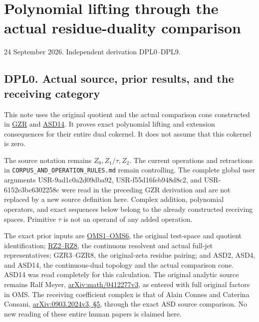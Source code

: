 \section{Polynomial lifting through the actual residue-duality
comparison}\label{polynomial-lifting-through-the-actual-residue-duality-comparison}

24 September 2026. Independent derivation DPL0--DPL9.

\subsection{DPL0. Actual source, prior results, and the receiving
category}\label{dpl0.-actual-source-prior-results-and-the-receiving-category}

This note uses the original quotient and the actual comparison cone
constructed in
\href{GLOBAL_ORIGINAL_ZETA_RESIDUE_DUALITY_INDEPENDENT.md}{GZR} and
\href{ACTUAL_SUPPORTED_DUALITY_INDEPENDENT.md}{ASD14}. It proves exact
polynomial lifting and extension consequences for their entire dual
cokernel. It does not assume that this cokernel is zero.

The source notation remains \(Z_0,Z_1/\tau,Z_2\). The current operations
and retractions in \nolinkurl{CORPUS_AND_OPERATION_RULES.md} remain controlling.
The complete global user arguments USR-9ad1c0a2d09dba92,
USR-f55d16feb948d8c2, and USR-6152e3bc6302258c were read in the
preceding GZR derivation and are not replaced by a new source definition
here. Complex addition, polynomial operators, and exact sequences below
belong to the already constructed receiving spaces. Primitive \(\tau\)
is not an operand of any added operation.

The exact prior inputs are
\href{ORIGINAL_MELLIN_SPECTRAL_SYNTHESIS.md}{OMS1--OMS6}, the original
test-space and quotient identification;
\href{https://github.com/KokunoYumeto/zeta-function-research-reader/blob/main/workbenches/splitzero-tandem/continuations/20260924-cohomology-weight-and-character-lifts/gct-weight-control/proofs/ORIGINAL_ZETA_RESOLVENT_AND_PROJECTORS.md}{RZ2--RZ8},
the continuous resolvent and actual full-jet representatives;
GZR3--GZR8, the original-zeta residue pairing; and ASD2, ASD4, and
ASD14, the continuous-dual topology and the actual comparison cone.
ASD14 was read completely for this calculation. The original analytic
source remains Ralf Meyer,
\href{https://arxiv.org/abs/math/0412277v3}{arXiv:math/0412277v3}, as
entered with full original factors in OMS. The receiving coefficient
complex is that of Alain Connes and Caterina Consani,
\href{https://arxiv.org/abs/0903.2024v3}{arXiv:0903.2024v3, §5}, through
the exact ASD source comparison. No new reading of these entire human
papers is claimed here.

